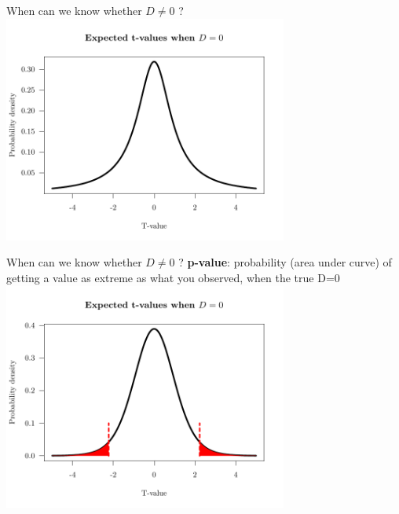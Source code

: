 \documentclass[10pt]{beamer}
\begin{document}
\begin{frame}{When can we know whether $D \neq 0$ ?}
  \centering \includegraphics[width=0.7\textwidth]{Figures/figure/tvalue-1}
\end{frame}


\begin{frame}{When can we know whether $D \neq 0$ ?}
\textbf{p-value}: probability (area under curve) of getting a value as extreme as what you observed, when the true D=0
\centering  \includegraphics[width=0.7\textwidth]{Figures/figure/tvalueth-1}
\end{frame}
\end{document}
